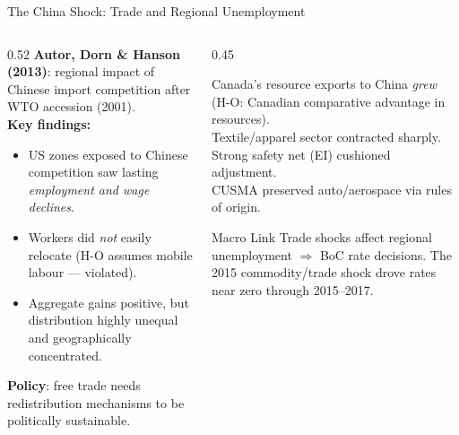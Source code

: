 \documentclass[aspectratio=169]{beamer}
\begin{document}
\begin{frame}[shrink=15]{The China Shock: Trade and Regional Unemployment}
\begin{columns}[T]
\begin{column}{0.52\textwidth}
\textbf{Autor, Dorn \& Hanson (2013)}: regional impact
of Chinese import competition after WTO accession (2001).\\[0.2em]
\textbf{Key findings:}
\begin{itemize}\small
  \item US zones exposed to Chinese competition saw
        lasting \emph{employment and wage declines}.
  \item Workers did \emph{not} easily relocate
        (H-O assumes mobile labour --- violated).
  \item Aggregate gains positive, but distribution
        highly unequal and geographically concentrated.
\end{itemize}
\vspace{0.2em}
\small\textbf{Policy}: free trade needs redistribution
mechanisms to be politically sustainable.
\end{column}
\begin{column}{0.45\textwidth}
\begin{canadex}
\footnotesize
Canada's resource exports to China \emph{grew}
(H-O: Canadian comparative advantage in resources).\\[0.2em]
Textile/apparel sector contracted sharply.\\[0.2em]
Strong safety net (EI) cushioned adjustment.\\[0.2em]
CUSMA preserved auto/aerospace via rules of origin.
\end{canadex}
\vspace{0.2em}
\begin{insight}{Macro Link}
\footnotesize Trade shocks affect regional unemployment
$\Rightarrow$ BoC rate decisions. The 2015
commodity/trade shock drove rates near zero
through 2015--2017.
\end{insight}
\end{column}
\end{columns}
\end{frame}
\end{document}
